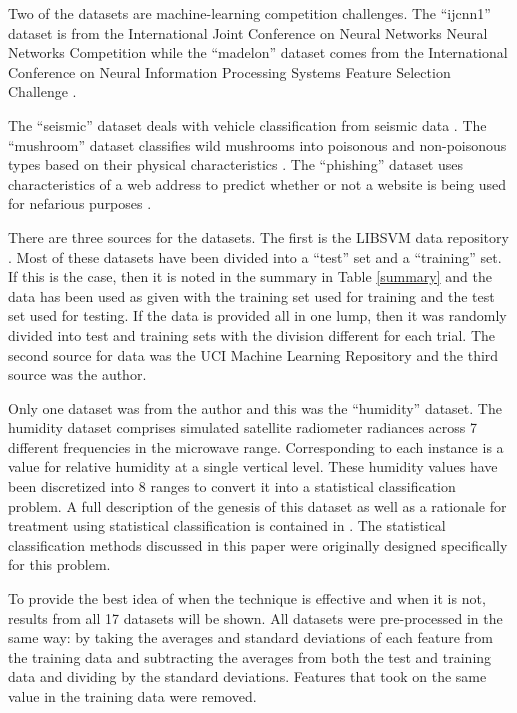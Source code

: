 \documentclass[11pt]{article}
\begin{document}
Two of the datasets are machine-learning competition challenges.
The ``ijcnn1'' dataset is from the International Joint Conference on Neural
Networks Neural Networks Competition\citep{Feldkamp_Puskorius1998} while the ``madelon'' dataset comes 
from the International Conference on Neural Information Processing Systems
Feature Selection Challenge \citep{Guyon2004}.

The ``seismic'' dataset deals with vehicle classification from seismic data
\citep{Duarte_Hu2004}.
The ``mushroom'' dataset classifies wild mushrooms
into poisonous and non-poisonous types based on their physical characteristics \citep{Iba_etal1988}.
The ``phishing'' dataset uses characteristics of a web address to predict whether
or not a website is being used for nefarious purposes \citep{Mohommad_etal2012}.

There are three sources for the datasets.
The first is the LIBSVM data repository \citep{Chang_Lin2011}.
Most of these datasets have been divided into a ``test'' set and a ``training'' set.
If this is the case, then it is noted in the summary in Table \ref{summary}
and the data has been used as given with the training set used for training
and the test set used for testing.
If the data is provided all in one lump, then it was randomly divided into 
test and training sets with the division different for each trial.
The second source for data was the UCI Machine Learning Repository
\citep{Lichman2013} and the third source was the author.

Only one dataset was from the author and this was the ``humidity'' dataset.
The humidity dataset comprises simulated satellite radiometer radiances across 7 different frequencies in the microwave range.
Corresponding to each instance is a value for relative humidity at a single
vertical level.
These humidity values have been discretized into 8 ranges to convert it into a statistical classification problem.
A full description of the genesis of this dataset as well as a rationale for
treatment using statistical classification is contained in \citet{Mills2009}.
The statistical classification methods discussed in this paper were originally
designed specifically for this problem.

To provide the best idea of when the technique is effective and when it is
not, results from all 17 datasets will be shown. 
All datasets were pre-processed in the same way: by taking the averages and
standard deviations of each feature from the training data and subtracting
the averages from both the test and training data and dividing by the 
standard deviations.
Features that took on the same value in the training data were removed.
\end{document}
